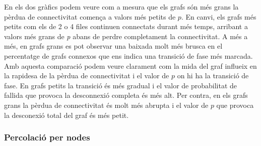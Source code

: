 \documentclass[a4paper]{article}
\begin{document}
	En els dos gràfics podem veure com a mesura que els grafs són més grans la pèrdua de connectivitat comença a valors més petits de $p$. En canvi, els grafs més petits com els de 2 o 4 files continuen connectats durant més temps, arribant a valors més grans de \textit{p} abans de perdre completament la connectivitat. A més a més, en grafs grans es pot observar una baixada molt més brusca en el percentatge de grafs connexos que ens indica una transició de fase més marcada. \\
	
	Amb aquesta comparació podem veure clarament com la mida del graf influeix en la rapidesa de la pèrdua de connectivitat i el valor de $p$ on hi ha la transició de fase. En grafs petits la transició és més gradual i el valor de probabilitat de fallida que provoca la desconnexió completa és més alt. Per contra, en els grafs grans la pèrdua de connectivitat és molt més abrupta i el valor de $p$ que provoca la desconexió total del graf és més petit. \\
	
	
	\subsubsection{Percolació per nodes}
	
\end{document}
